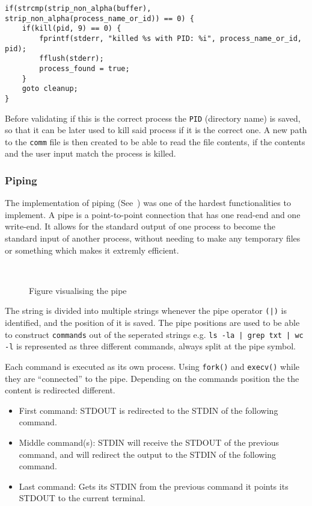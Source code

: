 \documentclass[12pt,english]{article}
\newcommand{\funcname}[1]{\texttt{#1()}\xspace} %
\begin{document}
\begin{verbatim}
if(strcmp(strip_non_alpha(buffer), strip_non_alpha(process_name_or_id)) == 0) {
    if(kill(pid, 9) == 0) {
        fprintf(stderr, "killed %s with PID: %i", process_name_or_id, pid);
        fflush(stderr);
        process_found = true;
    }
    goto cleanup;
}
\end{verbatim}

\medskip
 Before validating if this is the correct process
 the \texttt{PID} (directory name) is saved, so that it can be
 later used to kill said process if it is the correct one.
 A new path to the \texttt{comm} file is then created to
 be able to read the file contents, if the contents and the
 user input match the process is killed.

 \subsubsection{Piping} \label{sec:piping}
The implementation of piping
(See~)
was one of the hardest functionalities to implement.
A pipe is a point-to-point connection that has one read-end and one
write-end. It allows for the standard output of one process
to become the standard input of another process, without needing to
make any temporary files or something which makes it extremly
efficient.

\begin{figure}[!htb]
  \centering
  
  \caption{Figure visualising the pipe}~\label{fig:pipeVis}
\end{figure}

The string is divided into multiple strings whenever the 
pipe operator \texttt{(|)} is identified, and the position of it is saved.
The pipe positions are used to be able to construct 
\texttt{commands} out of the seperated strings e.g.
\texttt{ls -la | grep txt | wc -l}
is represented as three different commands, always split at the
pipe symbol.

\medskip
Each command is executed as its own process. Using \funcname{fork}
and \funcname{execv} while they are ``connected'' to the pipe.
Depending on the commands position the the content is redirected
different.

\begin{itemize}
\item First command: \textsc{STDOUT} is redirected to the \textsc{STDIN} of the following command.
\item Middle command(s): \textsc{STDIN} will receive the
  \textsc{STDOUT} of the previous command, and will redirect
  the output to the \textsc{STDIN} of the following command.
\item Last command: Gets its \textsc{STDIN} from the previous
  command it points its \textsc{STDOUT} to the current terminal.
  \end{itemize}
\end{document}
